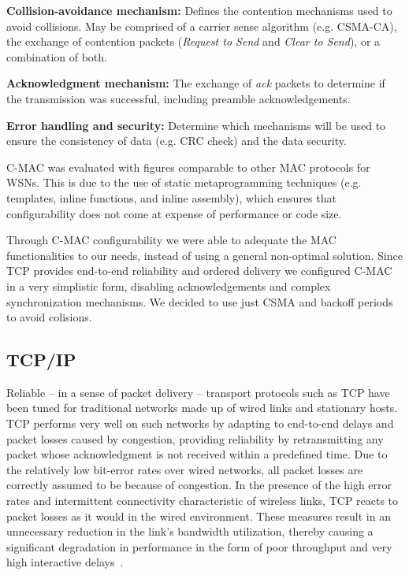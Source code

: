 \textbf{Collision-avoidance mechanism:} Defines the contention mechanisms used to
avoid collisions. May be comprised of a carrier sense algorithm (e.g. CSMA-CA),
the exchange of contention packets (\emph{Request to Send} and \emph{Clear to
Send}), or a combination of both.

\textbf{Acknowledgment mechanism:} The exchange of \emph{ack} packets to
determine if the transmission was successful, including preamble acknowledgements.

\textbf{Error handling and security:} Determine which mechanisms will be used to
ensure the consistency of data (e.g. CRC check) and the data security.

C-MAC was evaluated with figures comparable to other MAC protocols for WSNs.
This is due to the use of static metaprogramming techniques (e.g. templates, inline functions, and 
inline assembly), which ensures that configurability does not come at expense of performance or code size. 

Through C-MAC configurability we were able to adequate the MAC functionalities to our needs, instead of using a general non-optimal solution.
Since TCP provides end-to-end reliability and ordered delivery we configured C-MAC in a very simplistic form, disabling acknowledgements and complex synchronization mechanisms.
We decided to use just CSMA and backoff periods to avoid colisions.

\subsection{TCP/IP}
\label{sec:tcp}
Reliable -- in a sense of packet delivery -- transport protocols such as TCP have been tuned for traditional networks made up of wired links and stationary hosts.
TCP performs very well on such networks by adapting to end-to-end delays and packet losses caused by congestion, providing reliability by retransmitting any packet whose acknowledgment is not received within a predefined time.
Due to the relatively low bit-error rates over wired networks, all packet losses are correctly assumed to be because of congestion.
In the presence of the high error rates and intermittent connectivity characteristic of wireless links, TCP reacts to packet losses as it would in the wired environment.
These measures result in an unnecessary reduction in the link's bandwidth utilization, thereby causing a significant degradation in performance in the form of poor throughput and very high interactive delays~\cite{Balakrishnan:1995}.


